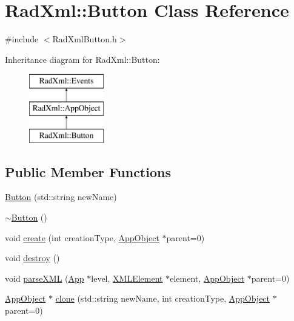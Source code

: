 \hypertarget{class_rad_xml_1_1_button}{\section{Rad\-Xml\-:\-:Button Class Reference}
\label{class_rad_xml_1_1_button}
}


{\ttfamily \#include $<$Rad\-Xml\-Button.\-h$>$}

Inheritance diagram for Rad\-Xml\-:\-:Button\-:\begin{figure}[H]
\begin{center}
\leavevmode
\includegraphics[height=3.000000cm]{class_rad_xml_1_1_button}
\end{center}
\end{figure}
\subsection*{Public Member Functions}
\begin{DoxyCompactItemize}
\item 
\hyperlink{class_rad_xml_1_1_button_a78cd256323b7049f940e425f357af63e}{Button} (std\-::string new\-Name)
\item 
\hyperlink{class_rad_xml_1_1_button_a90860a0063782496dd51961f2aa501bb}{$\sim$\-Button} ()
\item 
void \hyperlink{class_rad_xml_1_1_button_ae857f704dc8d07ce2d49da65ce69a634}{create} (int creation\-Type, \hyperlink{class_rad_xml_1_1_app_object}{App\-Object} $\ast$parent=0)
\item 
void \hyperlink{class_rad_xml_1_1_button_aac00a4df16e7390aca5316d54f999d3e}{destroy} ()
\item 
void \hyperlink{class_rad_xml_1_1_button_a7ad259c39003525556d9fe2ccc6cc8e0}{parse\-X\-M\-L} (\hyperlink{class_rad_xml_1_1_app}{App} $\ast$level, \hyperlink{class_x_m_l_element}{X\-M\-L\-Element} $\ast$element, \hyperlink{class_rad_xml_1_1_app_object}{App\-Object} $\ast$parent=0)
\item 
\hyperlink{class_rad_xml_1_1_app_object}{App\-Object} $\ast$ \hyperlink{class_rad_xml_1_1_button_a7f729543c1a665a47a5575cc4b46fb37}{clone} (std\-::string new\-Name, int creation\-Type, \hyperlink{class_rad_xml_1_1_app_object}{App\-Object} $\ast$parent=0)
\end{DoxyCompactItemize}
